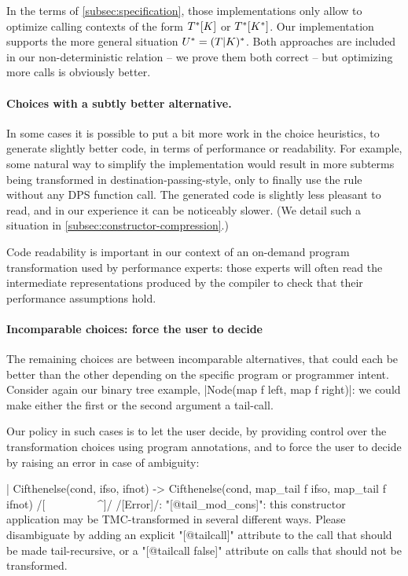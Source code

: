 In the terms of \cref{subsec:specification}, those implementations only allow to optimize calling contexts of the form $\datalangTailCtx{[\datalangConsFrame]}$ or $\datalangTailCtx{[\datalangConsCtx]}$. Our implementation supports the more general situation $\datalangTMCCtx = (\datalangTailFrame | \datalangConsFrame)^{*}$. Both approaches are included in our non-deterministic relation -- we prove them both correct -- but optimizing more calls is obviously better.

\paragraph{Choices with a subtly better alternative.} In some cases it
is possible to put a bit more work in the choice heuristics, to
generate slightly better code, in terms of performance or
readability. For example, some natural way to simplify the
implementation would result in more subterms being transformed in
destination-passing-style, only to finally use the
 rule without any DPS function call. The generated
code is slightly less pleasant to read, and in our experience it can
be noticeably slower. (We detail such a situation in \cref{subsec:constructor-compression}.)

Code readability is important in our context of an on-demand program
transformation used by performance experts: those experts will often
read the intermediate representations produced by the compiler to
check that their performance assumptions hold.

\paragraph{Incomparable choices: force the user to decide} \label{subsec:user-control}
The remaining choices are between incomparable alternatives, that could
each be better than the other depending on the specific program or
programmer intent. Consider again our binary tree example,
\ocaml|Node(map f left, map f right)|: we could make either the first
or the second argument a tail-call.

Our policy in such cases is to let the user decide, by providing
control over the transformation choices using \ocaml{[@tailcall]}
program annotations, and to force the user to decide by raising an
error in case of ambiguity:
\begin{Ocaml}
  | Cifthenelse(cond, ifso, ifnot) ->
      Cifthenelse(cond, map_tail f ifso, map_tail f ifnot)
      /[^^^^^^^^^^^^^^^^^^^^^^^^^^^^^^^^^^^^^^^^^^^^^^^^^^^^]/
/[Error]/: "[@tail_mod_cons]": this constructor application may be TMC-transformed
       in several different ways. Please disambiguate by adding an explicit
       "[@tailcall]" attribute to the call that should be made tail-recursive,
       or a "[@tailcall false]" attribute on calls that should not be
       transformed.
\end{Ocaml}

